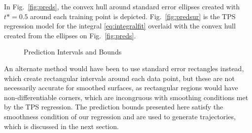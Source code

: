 \documentclass[letterpaper, 10 pt, conference]{ieeeconf}  %
\newcommand\NB[1]{$\spadesuit$\footnote{NB: #1}}
\begin{document}
In Fig.~\ref{fig:preds}, the convex hull around standard error ellipses created with $t* = 0.5$ around each training point is depicted. Fig.~\ref{fig:predsur} is the TPS regression model for the integral \eqref{eq:integralfit} overlaid with the convex hull \cite{bounds} created from the ellipses on Fig.~\ref{fig:preds}.
\begin{figure}[H]
	\centering
	\caption{Prediction Intervals and Bounds}
	\label{fig:bounds}
\end{figure}
An alternate method would have been to use standard error rectangles\cite{stdellipse} instead, which create rectangular intervals around each data point, but these are not necessarily accurate for smoothed surfaces, as rectangular regions would have non-differentiable corners, which are incongruous with smoothing conditions met by the TPS regression. The prediction bounds presented here satisfy the smoothness condition of our regression and are used to generate trajectories, which is discussed in the next section. 
\end{document}
